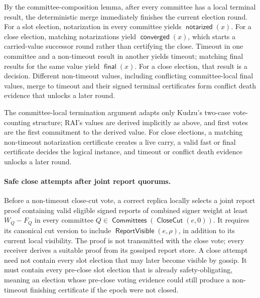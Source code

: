 \documentclass[sigplan,twocolumn,review,anonymous]{acmart}
\newcommand{\func}[1]{\operatorname{\mathsf{#1}}}
\newcommand{\CloseCut}{\func{CloseCut}}
\newcommand{\notarized}{\func{notarized}}
\newcommand{\converged}{\func{converged}}
\newcommand{\final}{\func{final}}
\newcommand{\Committees}{\func{Committees}}
\newcommand{\ReportVisible}{\func{ReportVisible}}
\begin{document}
By the committee-composition lemma, after every committee has a local terminal result, the
deterministic merge immediately finishes the current election round.  For a slot election, notarization
in every committee yields \(\notarized(x)\).  For a close election, matching notarizations yield
\(\converged(x)\), which starts a carried-value successor round rather than certifying the close.
Timeout in one committee and a non-timeout result in another yields timeout; matching final results for
the same value yield \(\final(x)\).  For a close election, that result is a decision.  Different
non-timeout values, including conflicting committee-local final values, merge to timeout and their
signed terminal certificates form conflict death evidence that unlocks a later round.

The committee-local termination argument adapts only Kudzu's two-case vote-counting structure; RAI's
values are derived implicitly as above, and first votes are the first commitment to the derived value.
For close elections, a matching non-timeout notarization certificate creates a live carry, a valid fast
or final certificate decides the logical instance, and timeout or conflict death evidence unlocks a
later round.

\paragraph{Safe close attempts after joint report quorums.}
Before a non-timeout close-cut vote, a correct replica locally selects a joint report proof containing
valid eligible signed reports of combined signer weight at least \(W_Q-F_Q\) in every committee
\(Q\in\Committees(\CloseCut(e,0))\).  It requires its canonical cut version to include
\(\ReportVisible(e,\rho)\), in addition to its current local visibility.  The proof is not transmitted
with the close vote; every receiver derives a suitable proof from its gossiped report store.  A close
attempt need not contain every slot election that may later become visible by gossip.  It must contain
every pre-close slot election that is already safety-obligating, meaning an election whose pre-close
voting evidence could still produce a non-timeout finishing certificate if the epoch were not closed.
\end{document}
